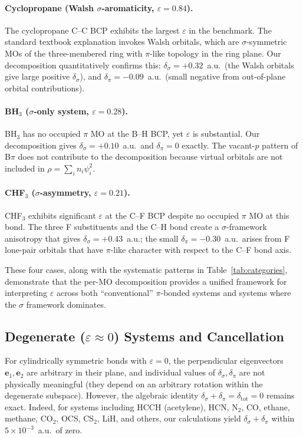 \documentclass[twoside,natbib]{svjour3}
\newcommand{\delsg}{\delta_{\sigma}}
\newcommand{\delpi}{\delta_{\pi}}
\newcommand{\eps}{\varepsilon}
\begin{document}
\paragraph{Cyclopropane (Walsh $\sigma$-aromaticity, $\eps = 0.84$).}
The cyclopropane C--C BCP exhibits the largest $\eps$ in the
benchmark. The standard textbook explanation invokes Walsh
orbitals, which are $\sigma$-symmetric MOs of the three-membered
ring with $\pi$-like topology in the ring plane. Our decomposition
quantitatively confirms this: $\delsg = +0.32$~a.u.\ (the Walsh
orbitals give large positive $\delsg$), and $\delpi = -0.09$~a.u.\
(small negative from out-of-plane orbital contributions).

\paragraph{BH$_3$ ($\sigma$-only system, $\eps = 0.28$).}
BH$_3$ has no occupied $\pi$ MO at the B--H BCP, yet $\eps$ is
substantial. Our decomposition gives $\delsg = +0.10$~a.u.\
and $\delpi = 0$ exactly. The vacant-$p$ pattern of B$\pi$ does not
contribute to the decomposition because virtual orbitals are not
included in $\rho = \sum_i n_i \psi_i^2$.

\paragraph{CHF$_3$ ($\sigma$-asymmetry, $\eps = 0.21$).}
CHF$_3$ exhibits significant $\eps$ at the C--F BCP despite no
occupied $\pi$ MO at this bond. The three F substituents and the
C--H bond create a $\sigma$-framework anisotropy that gives
$\delsg = +0.43$~a.u.; the small $\delpi = -0.30$~a.u.\ arises
from F lone-pair orbitals that have $\pi$-like character with
respect to the C--F bond axis.

These four cases, along with the systematic patterns in Table~\ref{tab:categories},
demonstrate that the per-MO decomposition provides a unified
framework for interpreting $\eps$ across both ``conventional''
$\pi$-bonded systems and systems where the $\sigma$ framework
dominates.

\subsection{Degenerate ($\eps \approx 0$) Systems and Cancellation}
\label{sec:results_degenerate}

For cylindrically symmetric bonds with $\eps = 0$, the
perpendicular eigenvectors $\mathbf{e}_1, \mathbf{e}_2$ are
arbitrary in their plane, and individual values of $\delsg, \delpi$
are not physically meaningful (they depend on an arbitrary rotation
within the degenerate subspace). However, the algebraic identity
$\delsg + \delpi = \delta_{\text{tot}} = 0$ remains exact.
Indeed, for systems including HCCH (acetylene), HCN, N$_2$, CO, ethane,
methane, CO$_2$, OCS, CS$_2$, LiH, and others, our calculations
yield $\delsg + \delpi$ within $5 \times 10^{-3}$~a.u.\ of zero.
\end{document}

